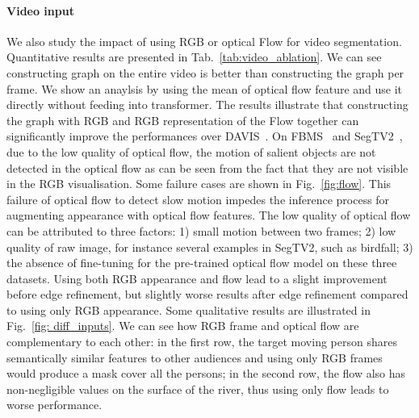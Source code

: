 \documentclass[twocolumn]{article}
\begin{document}
\paragraph*{Video input} 
We also study the impact of using RGB or optical Flow for video segmentation.  Quantitative results are presented in Tab.~\ref{tab:video_ablation}. We can see constructing graph on the entire video is better than constructing the graph per frame. We show an anaylsis by using the mean of optical flow feature and use it directly without feeding into transformer. The results illustrate that constructing the graph with RGB and RGB representation of the Flow together can significantly improve the performances over DAVIS~\cite{perazzi2016benchmark}. On FBMS~\cite{ochs2013segmentation} and SegTV2~\cite{li2013video}, due to the low quality of optical flow, the motion of salient objects are not detected in the optical flow as can be seen from the fact that they are not visible in the RGB visualisation. Some failure cases are shown in Fig.~\ref{fig:flow}. This failure of optical flow to detect slow motion impedes the inference process for augmenting appearance with optical flow features. The low quality of optical flow can be attributed to three factors: 1) small motion between two frames; 2) low quality of raw image, for instance several examples in SegTV2, such as birdfall; 3) the absence of fine-tuning for the pre-trained optical flow model on these three datasets.
Using both RGB appearance and flow lead to a slight improvement before  edge refinement, but slightly worse results  after edge refinement compared to using only RGB appearance. Some qualitative results are illustrated in Fig.~\ref{fig: diff_inputs}. We can see how RGB frame and optical flow are complementary to each other: in the first row, the target moving person shares semantically similar features to other audiences and using only RGB frames would produce a mask cover all the persons; in the second row, the flow also has non-negligible values on the surface of the river, thus using only flow leads to worse performance. 
\end{document}
